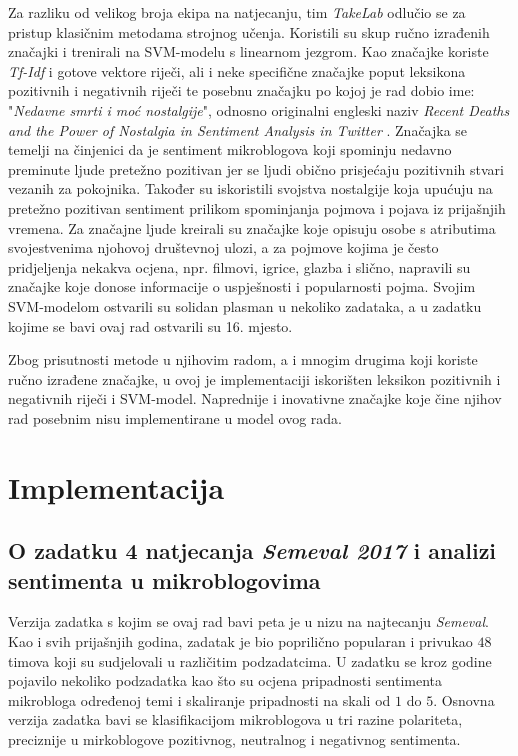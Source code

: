 \documentclass[times, utf8, zavrsni]{fer}
\begin{document}
Za razliku od velikog broja ekipa na natjecanju, tim \textit{TakeLab} odlučio se za pristup klasičnim metodama strojnog učenja. Koristili su skup ručno izrađenih značajki i trenirali na \gls{SVM}-modelu s linearnom jezgrom. Kao značajke koriste \emph{Tf-Idf} i gotove vektore riječi, ali i neke specifične značajke poput leksikona pozitivnih i negativnih riječi te posebnu značajku po kojoj je rad dobio ime: "\textit{Nedavne smrti i moć nostalgije}", odnosno originalni engleski naziv \textit{Recent Deaths and the Power of Nostalgia in Sentiment Analysis in Twitter} \citep{2017-takelab}. Značajka se temelji na činjenici da je sentiment mikroblogova koji spominju nedavno preminute ljude pretežno pozitivan jer se ljudi obično prisjećaju pozitivnih stvari vezanih za pokojnika. Također su iskoristili svojstva nostalgije koja upućuju na pretežno pozitivan sentiment prilikom spominjanja pojmova i pojava iz prijašnjih vremena. Za značajne ljude kreirali su značajke koje opisuju osobe s atributima svojestvenima njohovoj društevnoj ulozi, a za pojmove kojima je često pridjeljenja nekakva ocjena, npr. filmovi, igrice, glazba i slično, napravili su značajke koje donose informacije o uspješnosti i popularnosti pojma. Svojim \gls{SVM}-modelom ostvarili su solidan plasman u nekoliko zadataka, a u zadatku kojime se bavi ovaj rad ostvarili su 16. mjesto.

Zbog prisutnosti metode u njihovim radom, a i mnogim drugima koji koriste ručno izrađene značajke, u ovoj je implementaciji iskorišten leksikon pozitivnih i negativnih riječi i \gls{SVM}-model. Naprednije i inovativne značajke koje čine njihov rad posebnim nisu implementirane u model ovog rada.

\chapter{Implementacija}

\section{O zadatku 4 natjecanja \emph{Semeval 2017} i analizi sentimenta u mikroblogovima}

Verzija zadatka s kojim se ovaj rad bavi peta je u nizu na najtecanju \emph{Semeval}. Kao i svih prijašnjih godina, zadatak je bio poprilično popularan i privukao $48$ timova koji su sudjelovali u različitim podzadatcima. U zadatku se kroz godine pojavilo nekoliko podzadatka kao što su ocjena pripadnosti sentimenta mikrobloga određenoj temi i skaliranje pripadnosti na skali od $1$ do $5$. Osnovna verzija zadatka bavi se klasifikacijom mikroblogova u tri razine polariteta, preciznije u mirkoblogove pozitivnog, neutralnog i negativnog sentimenta. 
\end{document}
